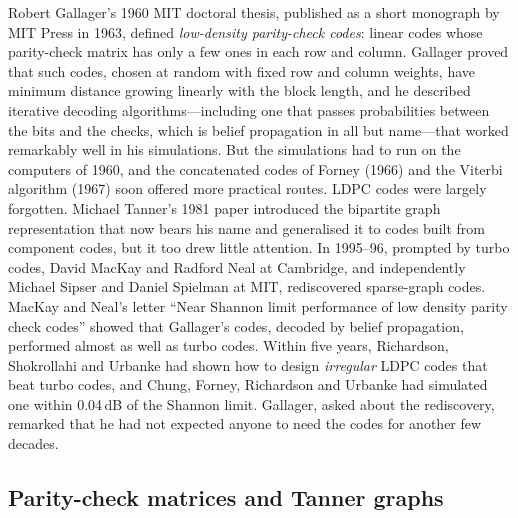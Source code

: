 \begin{history}
Robert Gallager's 1960 MIT doctoral thesis, published as a short monograph by MIT Press in 1963,
defined \emph{low-density parity-check codes}: linear codes whose parity-check matrix has only a
few ones in each row and column. Gallager proved that such codes, chosen at random with fixed row
and column weights, have minimum distance growing linearly with the block length, and he described
iterative decoding algorithms---including one that passes probabilities between the bits and the
checks, which is belief propagation in all but name---that worked remarkably well in his
simulations. But the simulations had to run on the computers of 1960, and the concatenated codes of
Forney (1966) and the Viterbi algorithm (1967) soon offered more practical routes. LDPC codes were
largely forgotten. Michael Tanner's 1981 paper introduced the bipartite graph representation that now
bears his name and generalised it to codes built from component codes, but it too drew little
attention. In 1995--96, prompted by turbo codes, David MacKay and Radford Neal at Cambridge, and
independently Michael Sipser and Daniel Spielman at MIT, rediscovered sparse-graph codes. MacKay and
Neal's letter ``Near Shannon limit performance of low density parity check codes'' showed that
Gallager's codes, decoded by belief propagation, performed almost as well as turbo codes. Within five
years, Richardson, Shokrollahi and Urbanke had shown how to design \emph{irregular} LDPC codes that
beat turbo codes, and Chung, Forney, Richardson and Urbanke had simulated one within 0.04\,dB of the
Shannon limit. Gallager, asked about the rediscovery, remarked that he had not expected anyone to
need the codes for another few decades.
\end{history}


\subsection{Parity-check matrices and Tanner graphs}

